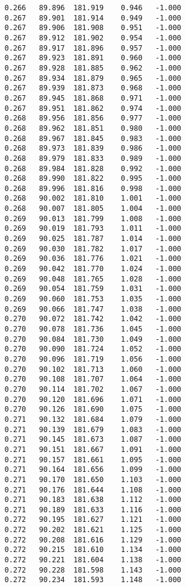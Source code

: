 \begin{verbatim}
   0.266   89.896  181.919    0.946   -1.000
   0.267   89.901  181.914    0.949   -1.000
   0.267   89.906  181.908    0.951   -1.000
   0.267   89.912  181.902    0.954   -1.000
   0.267   89.917  181.896    0.957   -1.000
   0.267   89.923  181.891    0.960   -1.000
   0.267   89.928  181.885    0.962   -1.000
   0.267   89.934  181.879    0.965   -1.000
   0.267   89.939  181.873    0.968   -1.000
   0.267   89.945  181.868    0.971   -1.000
   0.267   89.951  181.862    0.974   -1.000
   0.268   89.956  181.856    0.977   -1.000
   0.268   89.962  181.851    0.980   -1.000
   0.268   89.967  181.845    0.983   -1.000
   0.268   89.973  181.839    0.986   -1.000
   0.268   89.979  181.833    0.989   -1.000
   0.268   89.984  181.828    0.992   -1.000
   0.268   89.990  181.822    0.995   -1.000
   0.268   89.996  181.816    0.998   -1.000
   0.268   90.002  181.810    1.001   -1.000
   0.268   90.007  181.805    1.004   -1.000
   0.269   90.013  181.799    1.008   -1.000
   0.269   90.019  181.793    1.011   -1.000
   0.269   90.025  181.787    1.014   -1.000
   0.269   90.030  181.782    1.017   -1.000
   0.269   90.036  181.776    1.021   -1.000
   0.269   90.042  181.770    1.024   -1.000
   0.269   90.048  181.765    1.028   -1.000
   0.269   90.054  181.759    1.031   -1.000
   0.269   90.060  181.753    1.035   -1.000
   0.269   90.066  181.747    1.038   -1.000
   0.270   90.072  181.742    1.042   -1.000
   0.270   90.078  181.736    1.045   -1.000
   0.270   90.084  181.730    1.049   -1.000
   0.270   90.090  181.724    1.052   -1.000
   0.270   90.096  181.719    1.056   -1.000
   0.270   90.102  181.713    1.060   -1.000
   0.270   90.108  181.707    1.064   -1.000
   0.270   90.114  181.702    1.067   -1.000
   0.270   90.120  181.696    1.071   -1.000
   0.270   90.126  181.690    1.075   -1.000
   0.271   90.132  181.684    1.079   -1.000
   0.271   90.139  181.679    1.083   -1.000
   0.271   90.145  181.673    1.087   -1.000
   0.271   90.151  181.667    1.091   -1.000
   0.271   90.157  181.661    1.095   -1.000
   0.271   90.164  181.656    1.099   -1.000
   0.271   90.170  181.650    1.103   -1.000
   0.271   90.176  181.644    1.108   -1.000
   0.271   90.183  181.638    1.112   -1.000
   0.271   90.189  181.633    1.116   -1.000
   0.272   90.195  181.627    1.121   -1.000
   0.272   90.202  181.621    1.125   -1.000
   0.272   90.208  181.616    1.129   -1.000
   0.272   90.215  181.610    1.134   -1.000
   0.272   90.221  181.604    1.138   -1.000
   0.272   90.228  181.598    1.143   -1.000
   0.272   90.234  181.593    1.148   -1.000

\end{verbatim}
